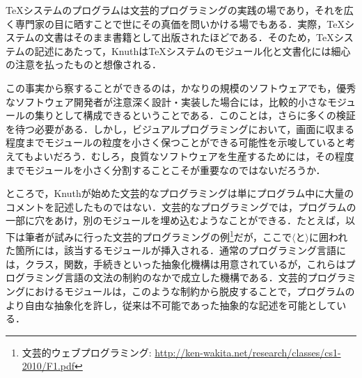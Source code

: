 \documentclass [11pt] {jsarticle}
\begin{document}
\TeX システムのプログラムは文芸的プログラミングの実践の場であり，それを広く専門家の目に晒すことで世にその真価を問いかける場でもある．実際，\TeX システムの文書はそのまま書籍\cite {Knuth86TeX:-The-Program}として出版されたほどである．そのため，\TeX システムの記述にあたって，Knuthは\TeX システムのモジュール化と文書化には細心の注意を払ったものと想像される．

この事実から察することができるのは，かなりの規模のソフトウェアでも，優秀なソフトウェア開発者が注意深く設計・実装した場合には，比較的小さなモジュールの集りとして構成できるということである．このことは，さらに多くの検証を待つ必要がある．しかし，ビジュアルプログラミングにおいて，画面に収まる程度までモジュールの粒度を小さく保つことができる可能性を示唆していると考えてもよいだろう．むしろ，良質なソフトウェアを生産するためには，その程度までモジュールを小さく分割することこそが重要なのではないだろうか．

ところで，Knuthが始めた文芸的なプログラミングは単にプログラム中に大量のコメントを記述したものではない．文芸的なプログラミングでは，プログラムの一部に穴をあけ，別のモジュールを埋め込むようなことができる．たとえば，以下は筆者が試みに行った文芸的プログラミングの例\footnote {文芸的ウェブプログラミング: \url {http://ken-wakita.net/research/classes/cs1-2010/F1.pdf}}だが，ここで$\langle\text {と}\rangle$に囲われた箇所には，該当するモジュールが挿入される．通常のプログラミング言語には，クラス，関数，手続きといった抽象化機構は用意されているが，これらはプログラミング言語の文法の制約のなかで成立した機構である．文芸的プログラミングにおけるモジュールは，このような制約から脱皮することで，プログラムのより自由な抽象化を許し，従来は不可能であった抽象的な記述を可能としている．
\end{document}

